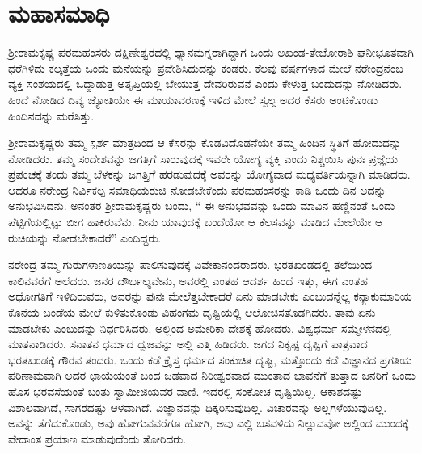 
\chapter{ಮಹಾಸಮಾಧಿ }

\vskip 2pt

 ಶ‍್ರೀರಾಮಕೃಷ್ಣ ಪರಮಹಂಸರು ದಕ್ಷಿಣೇಶ್ವರದಲ್ಲಿ ಧ್ಯಾನಮಗ್ನರಾಗಿದ್ದಾಗ ಒಂದು ಅಖಂಡ-ತೇಜೋರಾಶಿ ಘನೀಭೂತವಾಗಿ ಧರೆಗಿಳಿದು ಕಲ್ಕತ್ತೆಯ ಒಂದು ಮನೆಯನ್ನು ಪ್ರವೇಶಿಸಿದುದನ್ನು ಕಂಡರು. ಕೆಲವು ವರ್ಷಗಳಾದ ಮೇಲೆ ನರೇಂದ್ರನೆಂಬ ವ್ಯಕ್ತಿ ಸಂಶಯದಲ್ಲಿ ಒದ್ದಾಡುತ್ತ ಅತೃಪ್ತಿಯಲ್ಲಿ ಬೇಯುತ್ತ ದೇವರಿರುವನೆ ಎಂದು ಕೇಳುತ್ತ ಬಂದುದನ್ನು ನೋಡಿದರು. ಹಿಂದೆ ನೋಡಿದ ದಿವ್ಯ ಜ್ಯೋತಿಯೇ ಈ ಮಾಯಾವರಣಕ್ಕೆ ಇಳಿದ ಮೇಲೆ ಸ್ವಲ್ಪ ಅದರ ಕೆಸರು ಅಂಟಿಕೊಂಡು ಹಿಂದಿನದನ್ನು ಮರೆಸಿತ್ತು. 

\vskip 2pt

 ಶ‍್ರೀರಾಮಕೃಷ್ಣರು ತಮ್ಮ ಸ್ಪರ್ಶ ಮಾತ್ರದಿಂದ ಆ ಕೆಸರನ್ನು ಕೊಡವಿದೊಡನೆಯೇ ತಮ್ಮ ಹಿಂದಿನ ಸ್ಥಿತಿಗೆ ಹೋದುದನ್ನು ನೋಡಿದರು. ತಮ್ಮ ಸಂದೇಶವನ್ನು ಜಗತ್ತಿಗೆ ಸಾರುವುದಕ್ಕೆ ಇವರೇ ಯೋಗ್ಯ ವ್ಯಕ್ತಿ ಎಂದು ನಿಶ್ಚಯಿಸಿ ಪುನಃ ಪ್ರಜ್ಞೆಯ ಪ್ರಪಂಚಕ್ಕೆ ತಂದು ತಮ್ಮ ಬೆಳಕನ್ನು ಜಗತ್ತಿಗೆ ಹರಡುವುದಕ್ಕೆ ಅವರನ್ನು ಯೋಗ್ಯವಾದ ಮಧ್ಯವರ್ತಿಯನ್ನಾಗಿ ಮಾಡಿದರು. ಆದರೂ ನರೇಂದ್ರ ನಿರ್ವಿಕಲ್ಪ ಸಮಾಧಿಯರುಚಿ ನೋಡಬೇಕೆಂದು ಪರಮಹಂಸರನ್ನು ಕಾಡಿ ಒಂದು ದಿನ ಅದನ್ನು ಅನುಭವಿಸಿದನು. ಅನಂತರ ಶ‍್ರೀರಾಮಕೃಷ್ಣರು ಬಂದು, “ ಈ ಅನುಭವವನ್ನು ಒಂದು ಮಾವಿನ ಹಣ್ಣಿನಂತೆ ಒಂದು ಪೆಟ್ಟಿಗೆಯಲ್ಲಿಟ್ಟು ಬೀಗ ಹಾಕಿರುವೆನು. ನೀನು ಯಾವುದಕ್ಕೆ ಬಂದೆಯೋ ಆ ಕೆಲಸವನ್ನು ಮಾಡಿದ ಮೇಲೆಯೇ ಆ ರುಚಿಯನ್ನು ನೋಡಬೇಕಾದರೆ” ಎಂದಿದ್ದರು. 

\vskip 2pt

 ನರೇಂದ್ರ ತಮ್ಮ ಗುರುಗಳಾಣತಿಯನ್ನು ಪಾಲಿಸುವುದಕ್ಕೆ ವಿವೇಕಾನಂದರಾದರು. ಭರತಖಂಡದಲ್ಲಿ ತಲೆಯಿಂದ ಕಾಲಿನವರೆಗೆ ಅಲೆದರು. ಜನರ ದೌರ್ಬಲ್ಯವೇನು, ಅವರಲ್ಲಿ ಎಂತಹ ಆದರ್ಶ ಹಿಂದೆ ಇತ್ತು, ಈಗ ಎಂತಹ ಅಧೋಗತಿಗೆ ಇಳಿದಿರುವರು, ಅವರನ್ನು ಪುನಃ ಮೇಲೆತ್ತಬೇಕಾದರೆ ಏನು ಮಾಡಬೇಕು ಎಂಬುದನ್ನೆಲ್ಲ ಕನ್ಯಾಕುಮಾರಿಯ ಕೊನೆಯ ಬಂಡೆಯ ಮೇಲೆ ಕುಳಿತುಕೊಂಡು ವಿಹಂಗಮ ದೃಷ್ಟಿಯಲ್ಲಿ ಆಲೋಚಿಸತೊಡಗಿದರು. ತಾವು ಏನು ಮಾಡಬೇಕು ಎಂಬುದನ್ನು ನಿರ್ಧರಿಸಿದರು. ಅಲ್ಲಿಂದ ಅಮೇರಿಕಾ ದೇಶಕ್ಕೆ ಹೋದರು. ವಿಶ್ವಧರ್ಮ ಸಮ್ಮೇಳನದಲ್ಲಿ ಮಾತನಾಡಿದರು. ಸನಾತನ ಧರ್ಮದ ಧ್ವಜವನ್ನು ಅಲ್ಲಿ ಎತ್ತಿ ಹಿಡಿದರು. ಜಗದ ನಿಕೃಷ್ಟ ದೃಷ್ಟಿಗೆ ಪಾತ್ರವಾದ ಭರತಖಂಡಕ್ಕೆ ಗೌರವ ತಂದರು. ಒಂದು ಕಡೆ ಕ್ರೈಸ್ತ ಧರ್ಮದ ಸಂಕುಚಿತ ದೃಷ್ಟಿ, ಮತ್ತೊಂದು ಕಡೆ ವಿಜ್ಞಾನದ ಪ್ರಗತಿಯ ಪರಿಣಾಮವಾಗಿ ಅದರ ಛಾಯೆಯಂತೆ ಬಂದ ಜಡವಾದ ನಿರೀಶ್ವರವಾದ ಮುಂತಾದ ಭಾವನೆಗೆ ತುತ್ತಾದ ಜನರಿಗೆ ಒಂದು ಹೊಸ ಭರವಸೆಯಂತೆ ಬಂತು ಸ್ವಾಮೀಜಿಯವರ ವಾಣಿ. ಇದರಲ್ಲಿ ಸಂಕೋಚ ದೃಷ್ಟಿಯಿಲ್ಲ. ಆಕಾಶದಷ್ಟು ವಿಶಾಲವಾಗಿದೆ, ಸಾಗರದಷ್ಟು ಆಳವಾಗಿದೆ. ವಿಜ್ಞಾನವನ್ನು ಧಿಕ್ಕರಿಸುವುದಿಲ್ಲ. ವಿಚಾರವನ್ನು ಅಲ್ಲಗಳೆಯುವುದಿಲ್ಲ. ಅವನ್ನು ತೆಗೆದುಕೊಂಡು, ಅವು ಹೋಗುವವರೆಗೂ ಹೋಗಿ, ಅವು ಎಲ್ಲಿ ಬಸವಳಿದು ನಿಲ್ಲುವವೋ ಅಲ್ಲಿಂದ ಮುಂದಕ್ಕೆ ವೇದಾಂತ ಪ್ರಯಾಣ ಮಾಡುವುದೆಂದು ತೋರಿದರು. 


